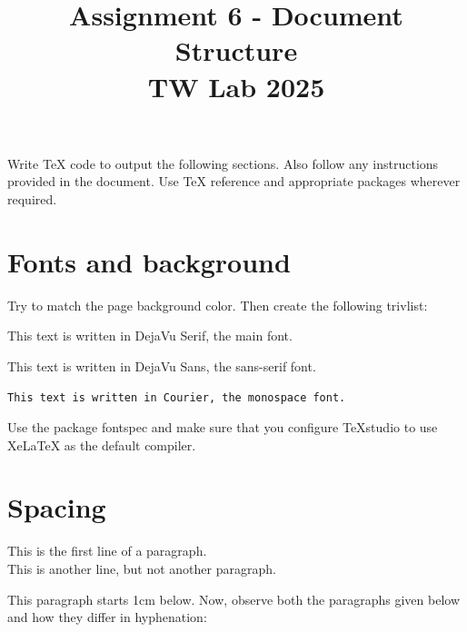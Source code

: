 \documentclass{article}
\title{\textbf{Assignment 6 - Document Structure}\\\large TW Lab 2025}
\author{}
\date{}
\begin{document}
\maketitle
\vspace{-2em}

\noindent Write \TeX{} code to output the following sections. Also follow any instructions provided in the document. Use \TeX{} reference and appropriate packages wherever required.

\section{Fonts and background}

Try to match the page background color. Then create the following trivlist:

\begin{trivlist}
    \item This text is written in DejaVu Serif, the main font.
    \item \textsf{This text is written in DejaVu Sans, the sans-serif font.}
    \item \texttt{This text is written in Courier, the monospace font.}
\end{trivlist}

Use the package fontspec and make sure that you configure TeXstudio to use XeLaTeX as the default compiler.

\section{Spacing}

This is the first line of a paragraph. \\
This is another line, but not another paragraph.

\vspace{1cm}
This paragraph starts 1cm below. Now, observe both the paragraphs given below and how they differ in hyphenation:

\begin{quote}
\noindent{}
\end{quote}

\begin{quote}
\noindent{}
\end{quote}
\end{document}
